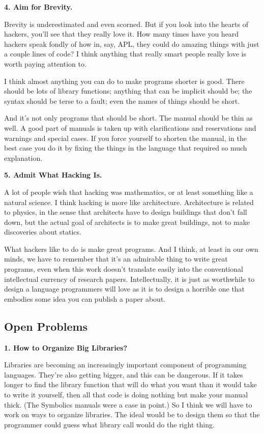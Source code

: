 \documentclass[12pt]{book}
\begin{document}
\textbf{4. Aim for Brevity.}

Brevity is underestimated and even scorned. But if you look into the
hearts of hackers, you'll see that they really love it. How many times
have you heard hackers speak fondly of how in, say, APL, they could do
amazing things with just a couple lines of code? I think anything that
really smart people really love is worth paying attention to.

I think almost anything you can do to make programs shorter is good.
There should be lots of library functions; anything that can be implicit
should be; the syntax should be terse to a fault; even the names of
things should be short.

And it's not only programs that should be short. The manual should be
thin as well. A good part of manuals is taken up with clarifications and
reservations and warnings and special cases. If you force yourself to
shorten the manual, in the best case you do it by fixing the things in
the language that required so much explanation.

\textbf{5. Admit What Hacking Is.}

A lot of people wish that hacking was mathematics, or at least something
like a natural science. I think hacking is more like architecture.
Architecture is related to physics, in the sense that architects have to
design buildings that don't fall down, but the actual goal of architects
is to make great buildings, not to make discoveries about statics.

What hackers like to do is make great programs. And I think, at least in
our own minds, we have to remember that it's an admirable thing to write
great programs, even when this work doesn't translate easily into the
conventional intellectual currency of research papers. Intellectually,
it is just as worthwhile to design a language programmers will love as
it is to design a horrible one that embodies some idea you can publish a
paper about.

\subsection{Open Problems}\label{open-problems}

\textbf{1. How to Organize Big Libraries?}

Libraries are becoming an increasingly important component of
programming languages. They're also getting bigger, and this can be
dangerous. If it takes longer to find the library function that will do
what you want than it would take to write it yourself, then all that
code is doing nothing but make your manual thick. (The Symbolics manuals
were a case in point.) So I think we will have to work on ways to
organize libraries. The ideal would be to design them so that the
programmer could guess what library call would do the right thing.
\end{document}
